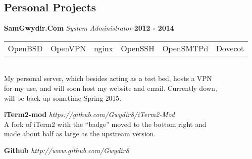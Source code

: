 {\begin{resume}
{  \section{\sc Personal Projects}}
\color{black}
{\bf SamGwydir.Com} {\em System Administrator} \hfill {\bf 2012 - 2014} \
\\
\begin{tabular}{l l l l l l}
  OpenBSD &  OpenVPN &  nginx &  OpenSSH & OpenSMTPd & Dovecot
\end{tabular}
\\
My personal server, which besides acting as a test bed, hosts a VPN \\
for my use, and will soon host my website and email. Currently down, \\
 will be back up sometime Spring 2015.
%

{\bf iTerm2-mod} {\em  https://github.com/Gwydir8/iTerm2-Mod}  \
\\
A fork of iTerm2 with the ``badge'' moved to the bottom right and \\
made about half as large as the upstream version.

{\bf Github} {\em http://www.github.com/Gwydir8}  \

\vspace*{.20in}
{\color{Black}
  \vspace{-.10in}
}
\end{resume}}
